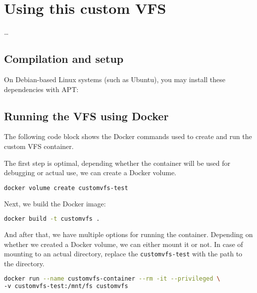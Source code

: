 \chapter{Using this custom VFS}

\ldots

\section*{Compilation and setup}

On Debian-based Linux systems (such as Ubuntu), you may install these dependencies with APT:


\section{Running the VFS using Docker}\label{sec:docker-guide}

The following code block shows the Docker commands used to create and run the custom VFS container.

The first step is optimal, depending whether the container will be used for debugging or actual use, we can create a Docker volume.

\begin{lstlisting}[language=bash, basicstyle=\ttfamily\small]
docker volume create customvfs-test
\end{lstlisting}

Next, we build the Docker image:

\begin{lstlisting}[language=bash, basicstyle=\ttfamily\small]
docker build -t customvfs .
\end{lstlisting}

And after that, we have multiple options for running the container.
Depending on whether we created a Docker volume, we can either mount it or not.
In case of mounting to an actual directory, replace the \texttt{customvfs-test} with the path to the directory.


\begin{lstlisting}[language=bash, basicstyle=\ttfamily\small]
docker run --name customvfs-container --rm -it --privileged \
-v customvfs-test:/mnt/fs customvfs
\end{lstlisting}

